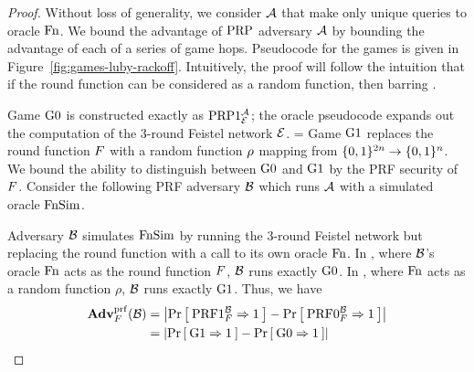 \begin{proof}
Without loss of generality, we consider $\advA$ that make only unique queries to oracle $\Fn$.
We bound the advantage of $\PRP$ adversary $\advA$ by bounding the advantage of each of a series of game hops.
Pseudocode for the games is given in Figure~\ref{fig:games-luby-rackoff}.
Intuitively, the proof will follow the intuition that if the round function can be considered as a random function, then barring .

Game $\G0$ is constructed exactly as $\PRP1^{\advA}_{\Feistel}$; the oracle pseudocode expands out the computation of the 3-round Feistel network $\Feistel$.
\bnm
{} = 
\enm
Game $\G1$ replaces the round function $\prf$ with a random function $\randfn$ mapping from $\braces{0,1}^{2n}\rightarrow\braces{0,1}^n$.
We bound the ability to distinguish between $\G0$ and $\G1$ by the PRF security of $\prf$.
Consider the following PRF adversary $\advB$ which runs $\advA$ with a simulated oracle $\FnSim$.

\begin{center}
\end{center}

Adversary $\advB$ simulates $\FnSim$ by running the 3-round Feistel network but replacing the round function with a call to its own oracle $\Fn$.
In , where $\advB$'s oracle $\Fn$ acts as the round function $\prf$, $\advB$ runs exactly $\G0$.
In , where $\Fn$ acts as a random function $\rho$, $\advB$ runs exactly $\G1$.
Thus, we have
\begin{align*}
\AdvPRF{\prf}{\advB} &= \absv*{\Prob{\PRF1_\prf^\advB\Rightarrow 1} - \Prob{\PRF0_\prf^\advB\Rightarrow1}}\\
&= \absv*{\Prob{\G1\Rightarrow 1} - \Prob{\G0\Rightarrow1}}\\
\end{align*}


\end{proof}
